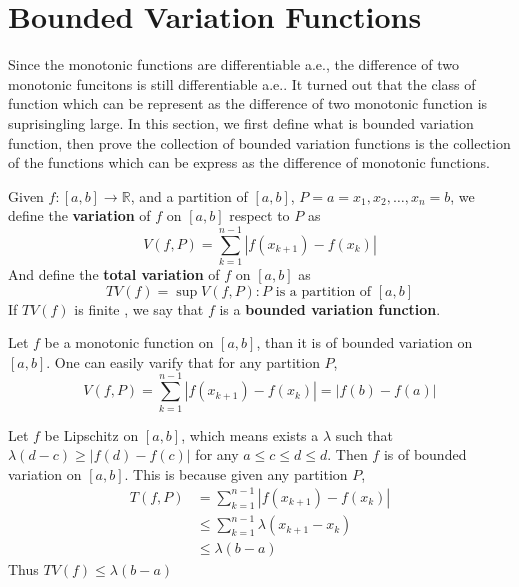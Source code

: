 \documentclass[lang=en, 12pt]{elegantbook}
\newcommand{\RR}{\mathbb{R}}
\begin{document}
    \section{Bounded Variation Functions}
        Since the monotonic functions are differentiable a.e., the difference of two monotonic funcitons is still differentiable a.e..
    It turned out that the class of function which can be represent as the difference of two monotonic function is suprisingling large.
    In this section, we first define what is bounded variation function, then prove the collection of bounded variation functions is 
    the collection of the functions which can be express as the difference of monotonic functions.
        \begin{definition}
            Given $f:[a,b] \to \RR$, and a partition of $[a,b]$, $P= {a = x_1, x_2, \dots, x_n=b}$, we define the \textbf{variation} of $f$ on $[a,b]$ respect
        to $P$ as 
            \begin{equation}
                V(f,P) = \sum_{k=1}^{n-1} |f(x_{k+1}) - f(x_k)|
            \end{equation}
            And define the \textbf{total variation} of $f$ on $[a,b]$ as 
            \begin{equation}
                TV(f) = \sup {V(f,P) : P \mbox{ is a partition of } [a,b]}
            \end{equation}
            If $TV(f)$ is finite , we say that $f$ is a \textbf{bounded variation function}.
        \end{definition}
        \begin{example}
            Let $f$ be a monotonic function on $[a,b]$, than it is of bounded variation on $[a,b]$. One can easily varify that for any 
        partition $P$,
            $$V(f,P) = \sum_{k=1}^{n-1} |f(x_{k+1}) - f(x_k)| = |f(b)-f(a)|$$ 
        \end{example}
        \begin{example}
            Let $f$ be Lipschitz on $[a,b]$, which means exists a $\lambda$ such that $\lambda (d-c) \geq |f(d) - f(c)|$ for any 
        $a\leq c \leq d \leq d$. Then $f$ is of 
        bounded variation on $[a,b]$. This is because given any partition $P$,
            \begin{equation*}
                \begin{aligned}
                    T(f,P) &= \sum_{k=1}^{n-1} |f(x_{k+1}) - f(x_k)| \\  
                    &\leq \sum_{k=1}^{n-1} \lambda (x_{k+1}-x_{k})\\
                    &\leq \lambda (b-a)
                \end{aligned}
            \end{equation*}
            Thus $TV(f) \leq \lambda (b-a)$
        \end{example}
        
\end{document}
